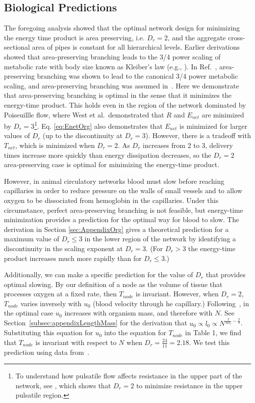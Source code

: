 \documentclass[12pt]{article}
\begin{document}
\subsection{Biological Predictions}
\label{sec:bio-predictions}

The foregoing analysis showed that the optimal network design for
minimizing the energy time product is area preserving, i.e. $D_r = 2$,
and the aggregate cross-sectional area of pipes is constant for all
hierarchical levels. Earlier derivations showed that area-preserving
branching leads to the 3/4 power scaling of metabolic rate with body
size known as Kleiber's law (e.g., \cite{west97, banavar10}).  In
Ref.~\cite{west97}, area-preserving branching was shown to lead to the canonical
3/4 power metabolic scaling, and area-preserving branching was
assumed in~\cite{banavar10}. Here we demonstrate that
area-preserving branching is optimal in the sense that it minimizes the energy-time product.
This holds even in the region of the network dominated by Poiseuillle flow, where
West et al.\ demonstrated that $R$ and $E_{net}$ are minimized by $D_r
=3$\footnote{To understand how pulsatile flow affects resistance in
  the upper part of the network, see \cite{west97}, which shows that
  $D_r = 2$ to minimize resistance in the upper pulsatile region.}. Eq. \ref{eq:EnetOrg} also demonstrates that $E_{net}$ is minimized for larger values of $D_r$ (up to the discontinuity at $D_r =3$). However, there is a tradeoff with $T_{net}$,
which is minimized when $D_r =2$. As $D_r$ increases from 2 to 3,
delivery times increase more quickly than energy dissipation decreases,
so the $D_r =2$ area-preserving case is optimal for minimizing the
energy-time product.

However, in animal circulatory networks blood must slow before reaching capillaries in order to
reduce pressure on the walls of small vessels and to allow oxygen to be
dissociated from hemoglobin in the capillaries.   Under this circumstance,
perfect area-preserving branching is not feasible, but energy-time 
minimization provides a prediction for the optimal way for blood to slow.
The derivation in Section \ref{sec:AppendixOrg} gives a
theoretical prediction for a maximum value of $D_r \leq 3$ in the lower region
of the network by identifying a discontinuity in the scaling exponent at $D_r =
3$. (For $D_r > 3$ the energy-time product increases much more rapidly than for
$D_r \leq 3$.)

Additionally, we can make a specific prediction for the value of $D_r$ that provides optimal slowing. By our definition of a node as the volume of tissue that processes oxygen at a fixed rate, then $T_{node}$ is invariant. However, when $D_r = 2$, $T_{node}$ varies inversely with $u_0$ (blood velocity through he capillary.) Following~\cite{banavar10}, in the optimal case $u_0$ increases with organism mass, and therefore with $N$. See Section~\ref{subsec:appendixLengthMass} for the derivation that $u_0 \propto l_0 \propto N^{\frac{2}{3D_r} - \frac{2}{9}}$. Substituting this equation for $u_0$ into the equation for $T_{node}$ in Table 1, we find that $T_{node}$ is invariant with respect to $N$ when $D_r = \frac{24}{11} = 2.18$. We test this prediction using data from~\cite{kolokotrones2010curvature}.
\end{document}
